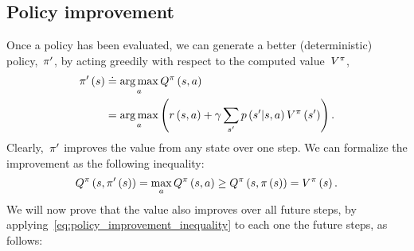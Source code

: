 \subsection{Policy improvement}
Once a policy has been evaluated, we can generate a better (deterministic) policy,~${\pi'}$, by acting greedily with respect to the computed value~${V^{\pi}}$,
\begin{align} \label{eq:policy_improvement}
	\policy'\left(\state\right)
		&\doteq\argmax_{\action}\actionvalue\policyscript\left(\state,\action\right) \notag \\
		&=\argmax_{\action}\left(\immediatereward\left(\state,\action\right)+\discount\sum_{\state'}\transition\left(\state'\middle\vert\state,\action\right)\statevalue\policyscript\left(\state'\right)\right).
\end{align}
Clearly,~${\pi'}$ improves the value from any state over one step. We can formalize the improvement as the following inequality:
\begin{equation} \label{eq:policy_improvement_inequality}
	\actionvalue\policyscript\left(\state,\policy'\left(\state\right)\right)=\max_{\action}\actionvalue\policyscript\left(\state,\action\right)\geq\actionvalue\policyscript\left(\state,\policy\left(\state\right)\right)=\statevalue\policyscript\left(\state\right).
\end{equation}
We will now prove that the value also improves over all future steps, by applying~\eqref{eq:policy_improvement_inequality} to each one the future steps, as follows:
